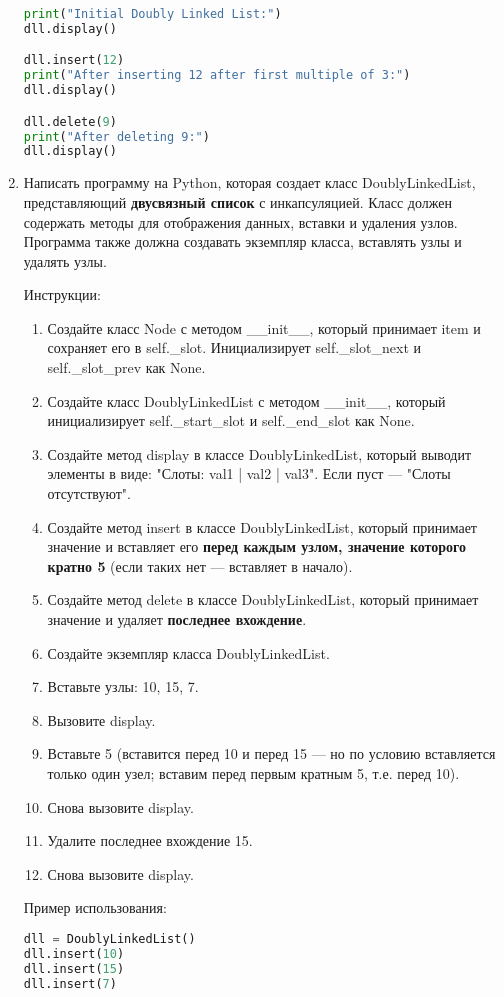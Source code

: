 \begin{enumerate}
\begin{lstlisting}[language=Python]
print("Initial Doubly Linked List:")
dll.display()

dll.insert(12)
print("After inserting 12 after first multiple of 3:")
dll.display()

dll.delete(9)
print("After deleting 9:")
dll.display()
\end{lstlisting}

\item Написать программу на Python, которая создает класс DoublyLinkedList, представляющий \textbf{двусвязный список} с инкапсуляцией. Класс должен содержать методы для отображения данных, вставки и удаления узлов. Программа также должна создавать экземпляр класса, вставлять узлы и удалять узлы.

Инструкции:
\begin{enumerate}
    \item Создайте класс Node с методом \_\_init\_\_, который принимает item и сохраняет его в self.\_slot. Инициализирует self.\_slot\_next и self.\_slot\_prev как None.
    \item Создайте класс DoublyLinkedList с методом \_\_init\_\_, который инициализирует self.\_start\_slot и self.\_end\_slot как None.
    \item Создайте метод display в классе DoublyLinkedList, который выводит элементы в виде: "Слоты: val1 | val2 | val3". Если пуст — "Слоты отсутствуют".
    \item Создайте метод insert в классе DoublyLinkedList, который принимает значение и вставляет его \textbf{перед каждым узлом, значение которого кратно 5} (если таких нет — вставляет в начало).
    \item Создайте метод delete в классе DoublyLinkedList, который принимает значение и удаляет \textbf{последнее вхождение}.
    \item Создайте экземпляр класса DoublyLinkedList.
    \item Вставьте узлы: 10, 15, 7.
    \item Вызовите display.
    \item Вставьте 5 (вставится перед 10 и перед 15 — но по условию вставляется только один узел; вставим перед первым кратным 5, т.е. перед 10).
    \item Снова вызовите display.
    \item Удалите последнее вхождение 15.
    \item Снова вызовите display.
\end{enumerate}

Пример использования:
\begin{lstlisting}[language=Python]
dll = DoublyLinkedList()
dll.insert(10)
dll.insert(15)
dll.insert(7)


\end{lstlisting}
\end{enumerate}
